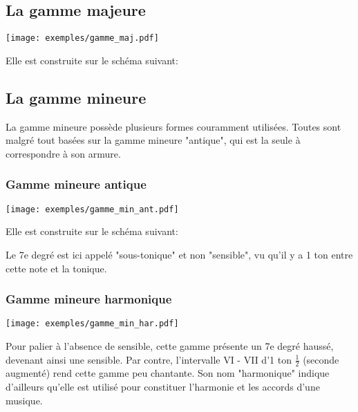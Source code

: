 \documentclass[11pt]{scrreprt}
\begin{document}
\subsection{La gamme majeure}
\begin{center}
  \texttt{[image: exemples/gamme\_maj.pdf]}
\end{center}
Elle est construite sur le schéma suivant: 
\begin{center}
\end{center}


\subsection{La gamme mineure}
La gamme mineure possède plusieurs formes couramment utilisées. Toutes sont malgré tout basées sur la gamme mineure "antique", qui est la seule à correspondre à son armure.

\subsubsection{Gamme mineure antique\label{min_ant}}
\begin{center}
   \texttt{[image: exemples/gamme\_min\_ant.pdf]}
\end{center}

Elle est construite sur le schéma suivant: 
\begin{center}
\end{center}
Le 7e degré est ici appelé "sous-tonique" et non "sensible", vu qu'il y a 1 ton entre cette note et la tonique.

\subsubsection{Gamme mineure harmonique}
\begin{center}
   \texttt{[image: exemples/gamme\_min\_har.pdf]}
\end{center}

Pour palier à l'absence de sensible, cette gamme présente un 7e degré haussé, devenant ainsi une sensible. Par contre, l'intervalle VI - VII d'1 ton $\frac1 2$ (seconde augmenté) rend cette gamme peu chantante. Son nom "harmonique" indique d'ailleurs qu'elle est utilisé pour constituer l'harmonie et les accords d'une musique.
\end{document}
